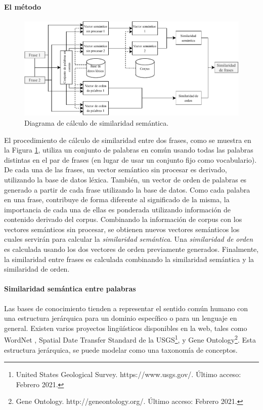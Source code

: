 \paragraph{El método}
\begin{figure}[h!]
	\centering
	\includegraphics[width=0.9\linewidth]{7_marco_teorico/imagenes/similaridad_sematinca_metodo}
	\caption{Diagrama de cálculo de similaridad semántica.}
	\label{fig:similaridadsematincametodo}
\end{figure}

El procedimiento de cálculo de similaridad entre dos frases, como se muestra en la Figura \ref{fig:similaridadsematincametodo}, utiliza un conjunto de palabras en común usando todas las palabras distintas en el par de frases (en lugar de usar un conjunto fijo como vocabulario). De cada una de las frases, un vector semántico sin procesar es derivado, utilizando la base de datos léxica. También, un vector de orden de palabras es generado a partir de cada frase utilizando la base de datos. Como cada palabra en una frase, contribuye de forma diferente al significado de la misma, la importancia de cada una de ellas es ponderada utilizando información de contenido derivado del corpus. Combinando la información de corpus con los vectores semánticos sin procesar, se obtienen nuevos vectores semánticos los cuales servirán para calcular la \textit{similaridad semántica}. Una \textit{similaridad de orden} es calculada usando los dos vectores de orden previamente generados. Finalmente, la similaridad entre frases es calculada combinando la similaridad semántica y la similaridad de orden.

\paragraph{Similaridad semántica entre palabras}
Las bases de conocimiento tienden a representar el sentido común humano con una estructura jerárquica para un dominio específico o para un lenguaje en general. Existen varios proyectos lingüísticos disponibles en la web, tales como WordNet \citep{miller1995wordnet}, Spatial Date Transfer Standard de la USGS\footnote{United States Geological Survey. https://www.usgs.gov/. Último acceso: Febrero 2021.}, y Gene Ontology\footnote{Gene Ontology. http://geneontology.org/. Último acceso: Febrero 2021.}. Esta estructura jerárquica, se puede modelar como una taxonomía de conceptos.

